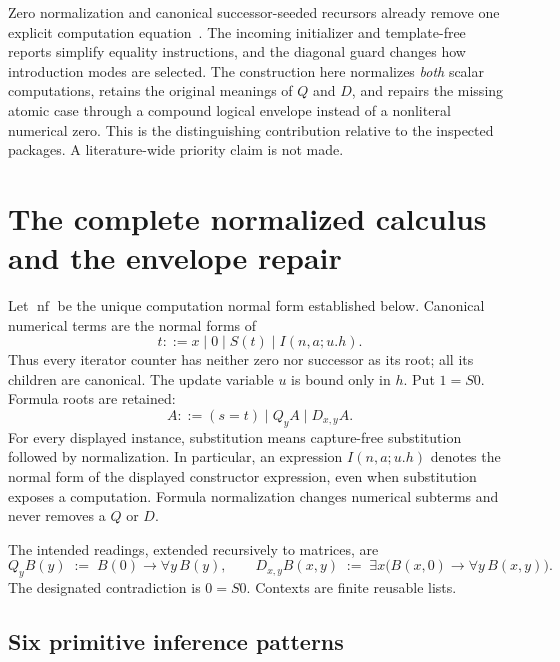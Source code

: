 \documentclass[11pt,letterpaper]{article}
\theoremstyle{definition}
\theoremstyle{remark}
\begin{document}
Zero normalization and canonical successor-seeded recursors already remove
one explicit computation equation~\cite{canonical,zero}. The incoming
initializer and template-free reports simplify equality instructions,
and the diagonal guard changes how introduction modes are selected.
The construction here normalizes \emph{both} scalar computations, retains
the original meanings of $Q$ and $D$, and repairs the missing atomic case
through a compound logical envelope instead of a nonliteral numerical
zero. This is the distinguishing contribution relative to the inspected
packages. A literature-wide priority claim is not made.

\section{The complete normalized calculus and the envelope repair}
\label{env:calculus}

Let $\operatorname{nf}$ be the unique computation normal form established
below. Canonical numerical terms are the normal forms of
\[
 t::=x\mid0\mid S(t)\mid I(n,a;u.h).
\]
Thus every iterator counter has neither zero nor successor as its root;
all its children are canonical. The update variable $u$ is bound only in
$h$. Put $1=S0$. Formula roots are retained:
\[
 A::=(s=t)\mid Q_y A\mid D_{x,y}A.
\]
For every displayed instance, substitution means capture-free substitution
followed by normalization. In particular, an expression
$I(n,a;u.h)$ denotes the normal form of the displayed constructor
expression, even when substitution exposes a computation. Formula
normalization changes numerical subterms and never removes a $Q$ or $D$.

The intended readings, extended recursively to matrices, are
\[
 Q_yB(y)\;:=\;B(0)\to\forall y\,B(y),\qquad
 D_{x,y}B(x,y)\;:=\;\exists x\bigl(B(x,0)\to\forall y\,B(x,y)\bigr).
\]
The designated contradiction is $0=S0$. Contexts are finite reusable lists.

\subsection{Six primitive inference patterns}
\end{document}
